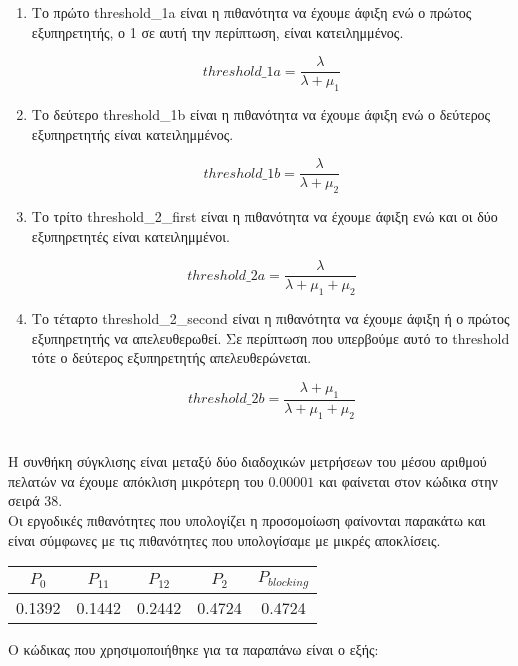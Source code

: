\documentclass[12pt]{article}
\begin{document}
\begin{enumerate}
    \item{}
        Το πρώτο threshold\_1a είναι η πιθανότητα να έχουμε άφιξη ενώ 
        ο πρώτος εξυπηρετητής, ο 1 σε αυτή την περίπτωση, είναι κατειλημμένος.

        \begin{equation}
            threshold\_1a = \frac{\lambda}{\lambda + \mu_1}
        \end{equation}
    \item{}
        Το δεύτερο threshold\_1b είναι η πιθανότητα να έχουμε άφιξη ενώ 
        ο δεύτερος εξυπηρετητής είναι κατειλημμένος.

        \begin{equation}
            threshold\_1b = \frac{\lambda}{\lambda + \mu_2}
        \end{equation}
    \item{}
        Το τρίτο threshold\_2\_first είναι η πιθανότητα να έχουμε άφιξη ενώ 
        και οι δύο εξυπηρετητές είναι κατειλημμένοι.

        \begin{equation}
            threshold\_2a = \frac{\lambda}{\lambda + \mu_1 + \mu_2}
        \end{equation}
    \item{}
        Το τέταρτο threshold\_2\_second είναι η πιθανότητα να έχουμε άφιξη ή 
        ο πρώτος εξυπηρετητής να απελευθερωθεί. Σε περίπτωση που υπερβούμε 
        αυτό το threshold τότε ο δεύτερος εξυπηρετητής απελευθερώνεται.

        \begin{equation}
            threshold\_2b = \frac{\lambda + \mu_1}{\lambda + \mu_1 + \mu_2}
        \end{equation}
        
\end{enumerate}
\\

Η συνθήκη σύγκλισης είναι μεταξύ δύο διαδοχικών μετρήσεων του μέσου αριθμού πελατών 
να έχουμε απόκλιση μικρότερη του $0.00001$ και φαίνεται στον κώδικα στην σειρά 
$38$.\\

Οι εργοδικές πιθανότητες που υπολογίζει η προσομοίωση φαίνονται παρακάτω και είναι 
σύμφωνες με τις πιθανότητες που υπολογίσαμε με μικρές αποκλίσεις.\\

\begin{center}
    \begin{tabular}{|c|c|c|c|c|}
        \hline
        $P_0$ & $P_{11}$ & $P_{12}$ & $P_2$ & $P_{blocking}$ \\
        \hline
        0.1392 & 0.1442 & 0.2442 & 0.4724 & 0.4724 \\
        \hline
    \end{tabular}
\end{center}

Ο κώδικας που χρησιμοποιήθηκε για τα παραπάνω είναι ο εξής:


\end{document}
